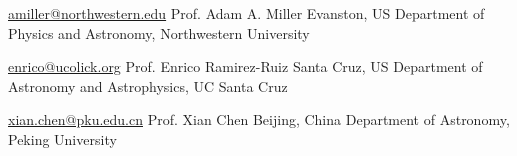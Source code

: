 


\begin{cvreferences}
	
\cvreference
	{\href{mailto:amiller@northwestern.edu}{\faEnvelope\acvHeaderIconSep amiller@northwestern.edu}} %
	{Prof. Adam A. Miller} %
	{Evanston, US} %
	{Department of Physics and Astronomy, Northwestern University} %


	
\cvreference
	{\href{mailto:enrico@ucolick.org}{\faEnvelope\acvHeaderIconSep enrico@ucolick.org}} %
	{Prof. Enrico Ramirez-Ruiz} %
	{Santa Cruz, US} %
	{Department of Astronomy and Astrophysics, UC Santa Cruz} %


\cvreference
	{\href{mailto:xian.chen@pku.edu.cn}{\faEnvelope\acvHeaderIconSep xian.chen@pku.edu.cn}} %
	{Prof. Xian Chen} %
	{Beijing, China} %
	{Department of Astronomy, Peking University} %
	
	
	




\end{cvreferences}